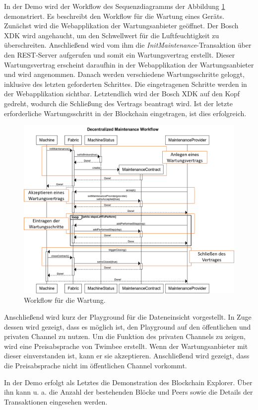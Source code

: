 In der Demo wird der Workflow des Sequenzdiagramms der Abbildung \ref{fig:maintenance-workflow} demonstriert. Es beschreibt den Workflow für die Wartung eines Geräts. Zunächst wird die Webapplikation der Wartungsanbieter geöffnet. Der Bosch XDK wird angehaucht, um den Schwellwert für die Luftfeuchtigkeit zu überschreiten. Anschließend wird vom ihm die \textit{InitMaintenance}-Transaktion über den REST-Server aufgerufen und somit ein Wartungsvertrag erstellt. Dieser Wartungsvertrag erscheint daraufhin in der Webapplikation der Wartungsanbieter und wird angenommen. Danach werden verschiedene Wartungsschritte geloggt, inklusive des letzten geforderten Schrittes. Die eingetragenen Schritte werden in der Webapplikation sichtbar. Letztendlich wird der Bosch XDK auf den Kopf gedreht, wodurch die Schließung des Vertrags beantragt wird. Ist der letzte erforderliche Wartungsschritt in der Blockchain eingetragen, ist dies erfolgreich.

\begin{figure}[!htbp]
    \centering
      \includegraphics[width=1.0\textwidth,angle=0]{images/maintenance-workflow-marked}
       \caption{Workflow für die Wartung.}
      \label{fig:maintenance-workflow}
\end{figure}

Anschließend wird kurz der Playground für die Dateneinsicht vorgestellt. In Zuge dessen wird gezeigt, dass es möglich ist, den Playground auf den öffentlichen und privaten Channel zu nutzen. Um die Funktion des privaten Channels zu zeigen, wird eine Preisabsprache von Twimbee erstellt. Wenn der Wartungsanbieter mit dieser einverstanden ist, kann er sie akzeptieren. Anschließend wird gezeigt, dass die Preisabsprache nicht im öffentlichen Channel vorkommt.

In der Demo erfolgt als Letztes die Demonstration des Blockchain Explorer. Über ihn kann u. a. die Anzahl der bestehenden Blöcke und Peers sowie die Details der Transaktionen eingesehen werden.